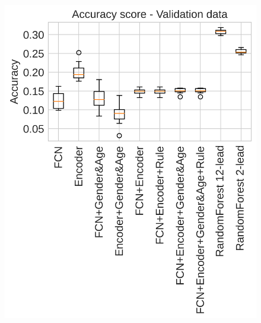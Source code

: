 \begin{figure}
{\begin{minipage}[c][1\width]{
	   0.5\textwidth}
	   \includegraphics[width=1.0\textwidth]{Figures/Accuracy_score_val}
	   \vspace{1em}
	\end{minipage}}
\caption{}
\end{figure}


















